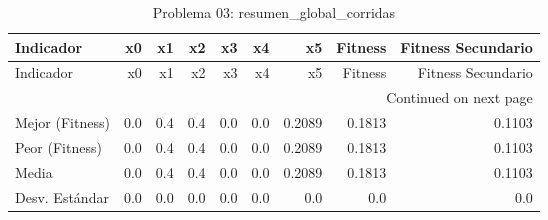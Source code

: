 \begin{longtable}{lrrrrrrrr}
\caption{Problema 03: resumen\_global\_corridas}\label{tab:resumen_global_corridas} \\
\toprule
Indicador & x0 & x1 & x2 & x3 & x4 & x5 & Fitness & Fitness Secundario \\
\midrule
\endfirsthead
\toprule
Indicador & x0 & x1 & x2 & x3 & x4 & x5 & Fitness & Fitness Secundario \\
\midrule
\endhead
\midrule
\multicolumn{9}{r}{Continued on next page} \\
\midrule
\endfoot
\bottomrule
\endlastfoot
Mejor (Fitness) & 0.0 & 0.4 & 0.4 & 0.0 & 0.0 & 0.2089 & 0.1813 & 0.1103 \\
Peor (Fitness) & 0.0 & 0.4 & 0.4 & 0.0 & 0.0 & 0.2089 & 0.1813 & 0.1103 \\
Media & 0.0 & 0.4 & 0.4 & 0.0 & 0.0 & 0.2089 & 0.1813 & 0.1103 \\
Desv. Estándar & 0.0 & 0.0 & 0.0 & 0.0 & 0.0 & 0.0 & 0.0 & 0.0 \\
\end{longtable}